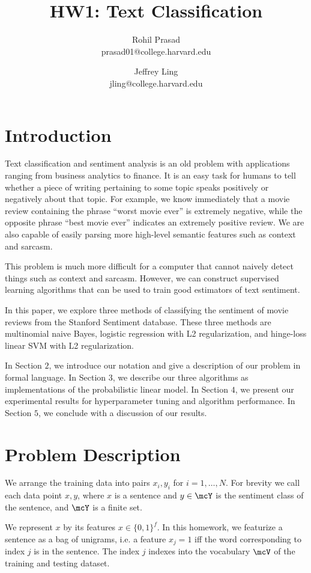 \documentclass[11pt]{article}
\title{HW1: Text Classification}
\author{Rohil Prasad \\ prasad01@college.harvard.edu \and Jeffrey Ling \\ jling@college.harvard.edu }
\begin{document}
\maketitle{}
\section{Introduction}

Text classification and sentiment analysis is an old problem with applications ranging from business analytics to finance.
It is an easy task for humans to tell whether a piece of writing pertaining to some topic speaks positively or negatively about that topic. 
For example, we know immediately that a movie review containing the phrase ``worst movie ever'' is extremely negative, while the opposite phrase 
``best movie ever'' indicates an extremely positive review. We are also capable of easily parsing more high-level semantic features such as context and sarcasm.

This problem is much more difficult for a computer that cannot naively detect things such as context and sarcasm. However, we can construct supervised learning algorithms that 
can be used to train good estimators of text sentiment. 

In this paper, we explore three methods of classifying the sentiment of movie reviews from the Stanford Sentiment database. These three methods are multinomial naive Bayes, 
logistic regression with L2 regularization, and hinge-loss linear SVM with L2 regularization. 

In Section $2$, we introduce our notation and give a description of our problem in formal language. In Section $3$, we describe our three algorithms as implementations of 
the probabilistic linear model. In Section $4$, we present our experimental results for hyperparameter tuning and algorithm performance. In Section $5$, we conclude with a 
discussion of our results. 

\section{Problem Description}

We arrange the training data into pairs $x_i, y_i$ for $i = 1, \ldots, N$. For brevity we call each data point $x, y$, where $x$ is a sentence and $y \in \mcY$ is the sentiment class of the sentence, and $\mcY$ is a finite set.

We represent $x$ by its features $x \in \{0, 1\}^f$. In this homework, we featurize a sentence as a bag of unigrams, i.e. a feature $x_j = 1$ iff the word corresponding to index $j$ is in the sentence. The index $j$ indexes into the vocabulary $\mcV$ of the training and testing dataset.
\end{document}
